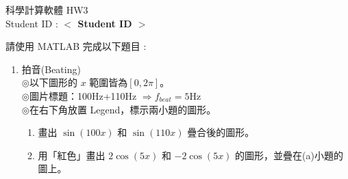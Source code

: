 \documentclass[12pt,a4paper]{article}
\newcommand{\placeholder}[1]{\textbf{$<$ #1 $>$}}
\newcommand{\idnumber}{\placeholder{Student ID}}
\begin{document}
\begin{CJK}{UTF8}{bsmi}
\begin{flushleft}科學計算軟體 HW3
\\Student ID : \idnumber{}\end{flushleft}

請使用 MATLAB 完成以下題目 : 
\begin{enumerate}
\item 拍音(Beating)\\
$\circledcirc$以下圖形的 $x$ 範圍皆為$[0,2\pi]$。\\
$\circledcirc$圖片標題：100Hz+110Hz $\Rightarrow f_{beat}=5$Hz\\
$\circledcirc$在右下角放置 Legend，標示兩小題的圖形。
\begin{enumerate} 
\item 畫出 $\sin(100x)$ 和 $\sin(110x)$ 疊合後的圖形。

\item 用「紅色」畫出 $2\cos(5x)$ 和 $-2\cos(5x)$ 的圖形，並疊在(a)小題的圖上。
\end{enumerate}
\end{enumerate}
\end{CJK}
\end{document}
